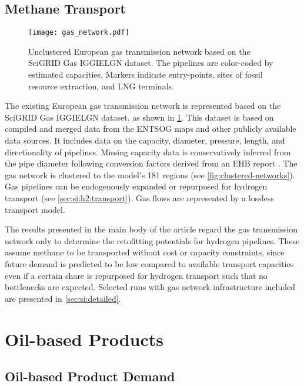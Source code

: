 \subsection{Methane Transport}
\label{sec:si:methane:transport}

\begin{figure}
    \texttt{[image: gas\_network.pdf]}
    \label{fig:gas-raw}
    \caption{Unclustered European gas transmission network based on the
    SciGRID Gas IGGIELGN dataset. The pipelines are color-coded by estimated capacities. Markers indicate entry-points, sites of fossil resource extraction, and LNG terminals.}
\end{figure}

The existing European gas transmission network is represented based on the
SciGRID Gas IGGIELGN dataset, as shown in
\cref{fig:gas-raw}. This dataset is based on compiled and merged data from the
ENTSOG maps and other publicly available
data sources. It includes data on the capacity, diameter, pressure, length, and
directionality of pipelines. Missing capacity data is conservatively inferred
from the pipe diameter following conversion factors derived from an EHB report
. The gas network is clustered to the
model's 181 regions (see \cref{fig:clustered-networks}). Gas pipelines can be
endogenously expanded or repurposed for hydrogen transport (see
\cref{sec:si:h2:transport}). Gas flows are represented by a lossless transport
model.

The results presented in the main body of the article regard the gas
transmission network only to determine the retofitting potentials for hydrogen
pipelines. These assume methane to be transported without cost or capacity
constraints, since future demand is predicted to be low compared to available
transport capacities even if a certain share is repurposed for hydrogen
transport such that no bottlenecks are expected. Selected runs with gas network
infrastructure included are presented in \cref{sec:si:detailed}.

\section{Oil-based Products}
\label{sec:si:oil}

\subsection{Oil-based Product Demand}
\label{sec:si:demand}

